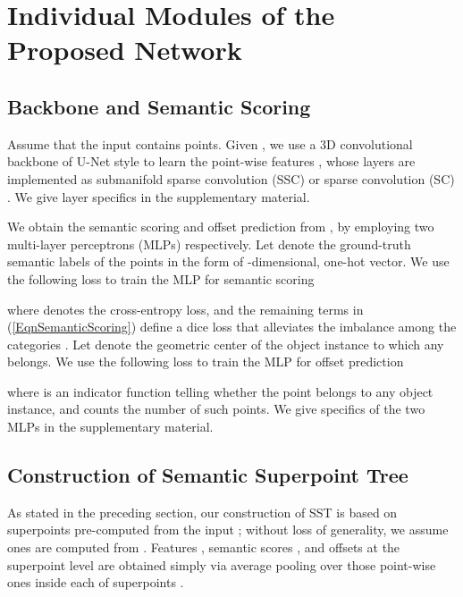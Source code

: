 \documentclass[10pt,twocolumn,letterpaper]{article}
\begin{document}
\section{Individual Modules of the Proposed Network}
\label{SecModules}

\subsection{Backbone and Semantic Scoring}

Assume that the input  contains  points. Given , we use a 3D convolutional backbone of U-Net style \cite{ronneberger2015u} to learn the point-wise features , whose layers are implemented as submanifold sparse convolution (SSC) or sparse convolution (SC) \cite{Graham_2018_CVPR}. We give layer specifics in the supplementary material.

We obtain the semantic scoring  and offset prediction  from , by employing two multi-layer perceptrons (MLPs) respectively. Let  denote the ground-truth semantic labels of the  points in the form of -dimensional, one-hot vector. We use the following loss to train the MLP for semantic scoring
\vspace{-0.5cm}


where  denotes the cross-entropy loss, and the remaining terms in (\ref{EqnSemanticScoring}) define a dice loss that alleviates the imbalance among the  categories \cite{milletari2016v}. Let  denote the geometric center of the object instance to which any  belongs. We use the following loss to train the MLP for offset prediction
\vspace{-0.2cm}

where  is an indicator function telling whether the point  belongs to any object instance, and  counts the number of such points. We give specifics of the two MLPs in the supplementary material.


\subsection{Construction of Semantic Superpoint Tree}
\label{SecSSTConstruction}

As stated in the preceding section, our construction of SST  is based on superpoints  pre-computed from the input ; without loss of generality, we assume  ones are computed from . Features , semantic scores , and offsets  at the superpoint level are obtained simply via average pooling over those point-wise ones inside each of superpoints .
\end{document}
